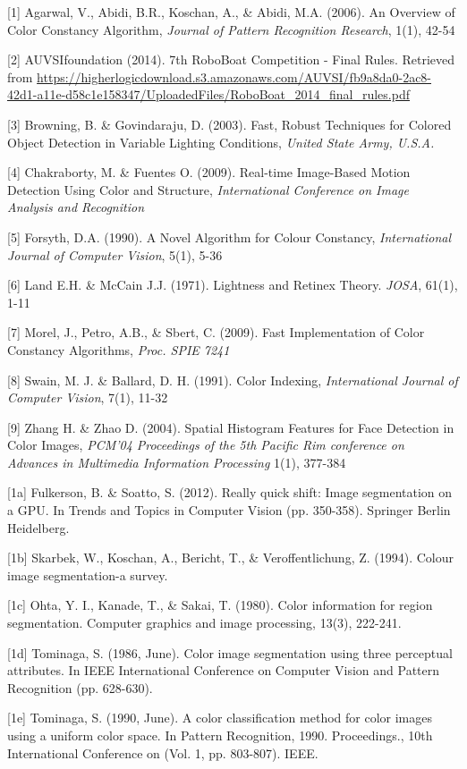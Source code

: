 \documentclass{article} %
\begin{document}
\small{

[1]  Agarwal, V., Abidi, B.R., Koschan, A., \& Abidi, M.A. (2006). An Overview of Color Constancy Algorithm, {\it Journal of Pattern Recognition Research}, 1(1), 42-54

[2] AUVSIfoundation (2014). 7th RoboBoat Competition - Final Rules. Retrieved from
\url{https://higherlogicdownload.s3.amazonaws.com/AUVSI/fb9a8da0-2ac8-42d1-a11e-d58c1e158347/UploadedFiles/RoboBoat_2014_final_rules.pdf}

[3] Browning, B. \& Govindaraju, D. (2003). Fast, Robust Techniques for Colored Object Detection in Variable Lighting Conditions, {\it United State Army, U.S.A.}

[4] Chakraborty, M. \& Fuentes O. (2009). Real-time Image-Based Motion Detection Using Color and Structure, {\it International Conference on Image Analysis and Recognition}

[5] Forsyth, D.A. (1990). A Novel Algorithm for Colour Constancy, {\it International Journal of Computer Vision}, 5(1), 5-36

[6] Land E.H. \& McCain J.J. (1971). Lightness and Retinex Theory. {\it JOSA}, 61(1), 1-11

[7] Morel, J., Petro, A.B., \& Sbert, C. (2009). Fast Implementation of Color Constancy Algorithms, {\it Proc. SPIE 7241}

[8] Swain, M. J. \& Ballard, D. H. (1991). Color Indexing, {\it International Journal of Computer Vision}, 7(1), 11-32

[9] Zhang H. \& Zhao D. (2004). Spatial Histogram Features for Face Detection in Color Images, {\it PCM'04 Proceedings of the 5th Pacific Rim conference on Advances in Multimedia Information Processing} 1(1), 377-384 

[1a] Fulkerson, B. \& Soatto, S. (2012). Really quick shift: Image segmentation on a GPU. In Trends and Topics in Computer Vision (pp. 350-358). Springer Berlin Heidelberg.

[1b] Skarbek, W., Koschan, A., Bericht, T., \& Veroffentlichung, Z. (1994). Colour image segmentation-a survey.

[1c] Ohta, Y. I., Kanade, T., \& Sakai, T. (1980). Color information for region segmentation. Computer graphics and image processing, 13(3), 222-241.

[1d] Tominaga, S. (1986, June). Color image segmentation using three perceptual attributes. In IEEE International Conference on Computer Vision and Pattern Recognition (pp. 628-630).

[1e] Tominaga, S. (1990, June). A color classification method for color images using a uniform color space. In Pattern Recognition, 1990. Proceedings., 10th International Conference on (Vol. 1, pp. 803-807). IEEE.

}
\end{document}
